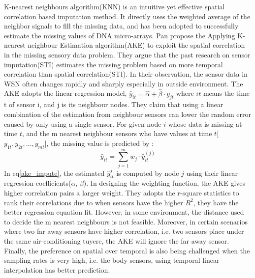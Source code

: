 K-nearest neighbours algorithm(KNN) is an intuitive yet effective spatial correlation based imputation method. It directly uses the weighted average of the neighbor signals to fill the missing data, and has been adopted to successfully estimate the missing values of DNA micro-arrays\cite{Troyanskaya:DNAKNN}.  
Pan\cite{pan2010k} propose the Applying K-nearest neighbour Estimation algorithm(AKE) to exploit the spatial correlation in the missing sensory data problem. They argue that the past research on sensor imputation(STI) estimates the missing problem based on more temporal correlation than spatial correlation(STI). In their observation, the sensor data in WSN often changes rapidly and sharply especially in outside environment. The AKE adopts the linear regression model,
$\hat{y}_{it} =\hat{\alpha} +\hat{\beta}\cdot y_{jt}$
 where $it$ means the time t of sensor i,  and j is its neighbour nodes.  
They claim that using a linear combination of the estimation from neighbour sensors can lower the random error caused by only using a single sensor. 
For given node $i$ whose data is missing at time $t$, and the m nearest neighbour sensors who have values at time $t$[$y_{1t}, y_{2t},\dots, y_{mt}$], the missing value is predicted by :   
 \begin{equation}
 \hat{y}_{it} =\sum_{j=1}^m w_j \cdot \hat{y}_{it}^{(j)}
 \label{ake_impute}
 \end{equation}
%
In eq\ref{ake_impute}, the estimated $\hat{y}_{it}^{j}$ is computed by node $j$ using their linear regression coefficients($\alpha$, $\beta$). In designing the weighting function, the AKE gives higher correlation pairs a larger weight. They adopts the r-square statistics to rank their correlations due to when sensors have the higher $R^2$, they have the better regression equation fit. 
However, in some environment, the distance used to decide the m nearest neighbours is not feasible. 
Moreover, in certain scenarios where two far away sensors have higher correlation, i.e. two sensors place under the same air-conditioning tuyere, the AKE will ignore the far away sensor.
Finally, the preference on spatial over temporal is also being challenged when the sampling rates is very high, i.e. the body sensors, using temporal linear interpolation has better prediction.   


